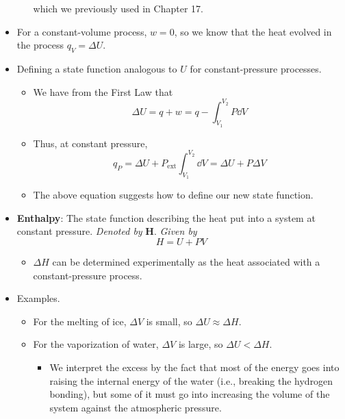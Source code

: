 \documentclass[../notes.tex]{subfiles}
\begin{document}
\begin{itemize}
\begin{itemize}
        which we previously used in Chapter 17.
    \end{itemize}
    \item For a constant-volume process, $w=0$, so we know that the heat evolved in the process $q_V=\Delta U$.
    \item Defining a state function analogous to $U$ for constant-pressure processes.
    \begin{itemize}
        \item We have from the First Law that
        \begin{equation*}
            \Delta U = q+w = q-\int_{V_1}^{V_2}P\dd{V}
        \end{equation*}
        \item Thus, at constant pressure,
        \begin{equation*}
            q_P = \Delta U+P_\text{ext}\int_{V_1}^{V_2}\dd{V}
            = \Delta U+P\Delta V
        \end{equation*}
        \item The above equation suggests how to define our new state function.
    \end{itemize}
    \item \textbf{Enthalpy}: The state function describing the heat put into a system at constant pressure. \emph{Denoted by} $\bm{H}$. \emph{Given by}
    \begin{equation*}
        H = U+PV
    \end{equation*}
    \begin{itemize}
        \item $\Delta H$ can be determined experimentally as the heat associated with a constant-pressure process.
    \end{itemize}
    \item Examples.
    \begin{itemize}
        \item For the melting of ice, $\Delta V$ is small, so $\Delta U\approx\Delta H$.
        \item For the vaporization of water, $\Delta V$ is large, so $\Delta U<\Delta H$.
        \begin{itemize}
            \item We interpret the excess by the fact that most of the energy goes into raising the internal energy of the water (i.e., breaking the hydrogen bonding), but some of it must go into increasing the volume of the system against the atmospheric pressure.
        \end{itemize}

\end{itemize}
\end{itemize}
\end{document}
